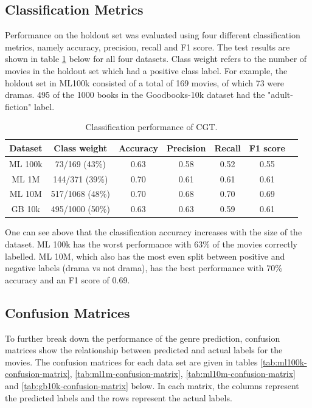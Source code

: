 \subsection{Classification Metrics}
Performance on the holdout set was evaluated using four different classification metrics, namely accuracy, precision, recall and F1 score. The test results are shown in table \ref{tab:ml-test-results} below for all four datasets. Class weight refers to the number of movies in the holdout set which had a positive class label. For example, the holdout set in ML100k consisted of a total of 169 movies, of which 73 were dramas. 495 of the 1000 books in the Goodbooks-10k dataset had the "adult-fiction" label.

\begin{table}[H]
\centering
\begin{tabular}{c | c | c | c | c | c | c}
\toprule
\textbf{Dataset} & \textbf{Class weight} & \textbf{Accuracy} & \textbf{Precision} & \textbf{Recall} & \textbf{F1 score} \\
\midrule
ML 100k & 73/169 (43\%) & 0.63 & 0.58 & 0.52 & 0.55 \\
\midrule
ML 1M & 144/371 (39\%) & 0.70 & 0.61 & 0.61 & 0.61 \\
\midrule
ML 10M & 517/1068 (48\%) & 0.70 & 0.68 & 0.70 & 0.69 \\
\midrule
GB 10k & 495/1000 (50\%) & 0.63 & 0.63 & 0.59 & 0.61 \\
\bottomrule
\end{tabular}
\caption[Holdout classification report]{Classification performance of CGT.}
\label{tab:ml-test-results}
\end{table}

One can see above that the classification accuracy increases with the size of the dataset. ML 100k has the worst performance with 63\% of the movies correctly labelled. ML 10M, which also has the most even split between positive and negative labels (drama vs not drama), has the best performance with 70\% accuracy and an F1 score of 0.69.

\subsection{Confusion Matrices}
To further break down the performance of the genre prediction, confusion matrices show the relationship between predicted and actual labels for the movies. The confusion matrices for each data set are given in tables \ref{tab:ml100k-confusion-matrix}, \ref{tab:ml1m-confusion-matrix}, \ref{tab:ml10m-confusion-matrix} and \ref{tab:gb10k-confusion-matrix} below. In each matrix, the columns represent the predicted labels and the rows represent the actual labels.

